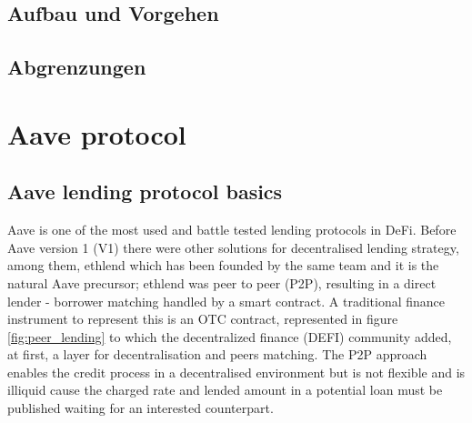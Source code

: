 \documentclass[11pt,a4paper,titlepage]{scrartcl}
\begin{document}
\subsection{Aufbau und Vorgehen}
\subsection{Abgrenzungen}

\section{Aave protocol}
\subsection{Aave lending protocol basics}
Aave is one of the most used and battle tested lending protocols in DeFi. Before Aave version 1 (V1) there were other solutions for decentralised lending strategy, among them, ethlend which has been founded by the same team and it is the natural Aave precursor; ethlend was  peer to peer (P2P), resulting in a direct lender - borrower matching handled by a smart contract. A traditional finance instrument to represent this is an OTC contract, represented in figure \ref{fig:peer_lending} to which the decentralized finance (DEFI) community added, at first, a layer for decentralisation and peers matching. The P2P approach enables  the credit process in a decentralised environment but is not flexible and is illiquid cause the charged rate and lended amount in a potential loan must be published waiting for an interested counterpart. 
\end{document}
